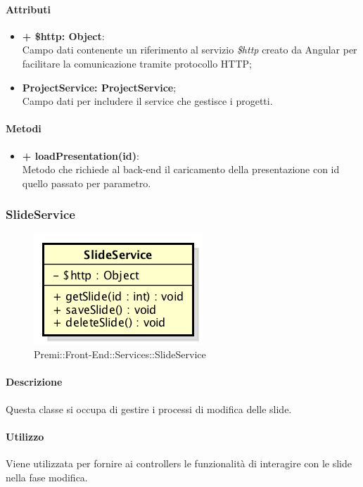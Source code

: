 	\paragraph{Attributi}
	\begin{itemize}
		\item \textbf{+ \$http: Object}:\\
		Campo dati contenente un riferimento al servizio \textit{\$http} creato da Angular per facilitare la comunicazione tramite protocollo HTTP;
		\item \textbf{ProjectService: ProjectService};\\
		Campo dati per includere il service che gestisce i progetti.
	\end{itemize}
	
	\paragraph{Metodi}
	\begin{itemize}
		\item \textbf{+ loadPresentation(id)}:\\
		Metodo che richiede al back-end il caricamento della presentazione con id quello passato per parametro.
	\end{itemize}
	
	
\subsubsection{SlideService}
	\begin{figure}[h]
		\centering
		\includegraphics[width=0.4\linewidth]{img/premi_front_end_services_slideservice}
		\caption[Premi::Front-End::Services::SlideService]{Premi::Front-End::Services::SlideService}
	\end{figure}
	
	\paragraph{Descrizione}
	Questa classe si occupa di gestire i processi di modifica delle slide.
	
	\paragraph{Utilizzo}
	Viene utilizzata per fornire ai controllers le funzionalità di interagire con le slide nella fase modifica.
	
